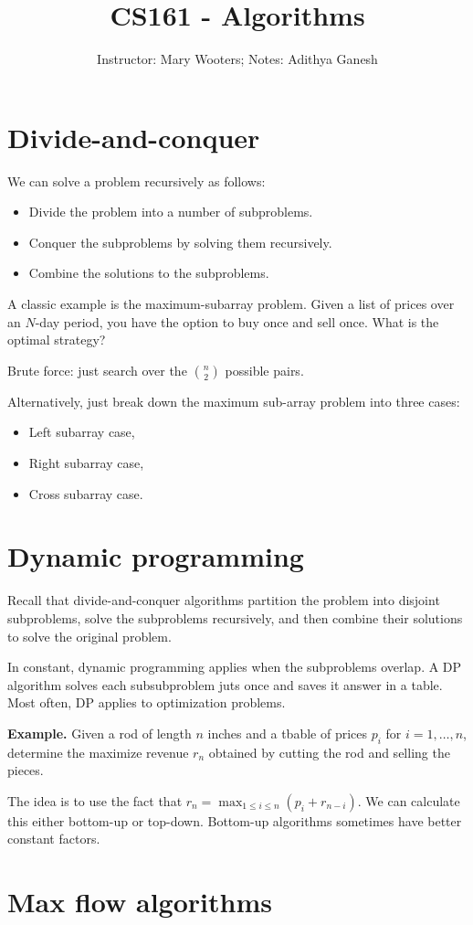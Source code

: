 \documentclass[12pt]{article}
\title{CS161 - Algorithms}
\author{Instructor: Mary Wooters; Notes: Adithya Ganesh}
\begin{document}
\section{Divide-and-conquer}

We can solve a problem recursively as follows:

\begin{itemize}
  \item Divide the problem into a number of subproblems.
  \item Conquer the subproblems by solving them recursively.
  \item Combine the solutions to the subproblems.
\end{itemize}

A classic example is the maximum-subarray problem.  Given a list of prices over an $N$-day period, you have the option to buy once and sell once.  What is the optimal strategy?

Brute force: just search over the $\binom{n}{2}$ possible pairs.

Alternatively, just break down the maximum sub-array problem into three cases:
\begin{itemize}
  \item Left subarray case,
  \item Right subarray case,
  \item Cross subarray case.
\end{itemize}

\section{Dynamic programming}

Recall that divide-and-conquer algorithms partition the problem into disjoint subproblems, solve the subproblems recursively, and then combine their solutions to solve the original problem.

In constant, dynamic programming applies when the subproblems overlap.  A DP algorithm solves each subsubproblem juts once and saves it answer in a table.  Most often, DP applies to optimization problems.

{\bf Example.} Given a rod of length $n$ inches and a tbable of prices $p_i$ for $i = 1, \dots, n$, determine the maximize revenue $r_n$ obtained by cutting the rod and selling the pieces.

The idea is to use the fact that $r_n = \max_{1 \leq i \leq n} (p_i + r_{n-i})$.  We can calculate this either bottom-up or top-down.  Bottom-up algorithms sometimes have better constant factors.

\section{Max flow algorithms}
\end{document}

